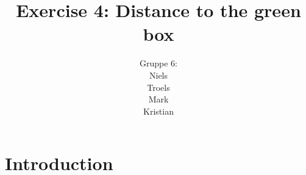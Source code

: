 \documentclass[a4paper,12pt]{article}
\title{Exercise 4: Distance to the green box}
\author{Gruppe 6:\\Niels\\Troels\\Mark\\Kristian}
\begin{document}
\maketitle

\section{Introduction}
\end{document}
